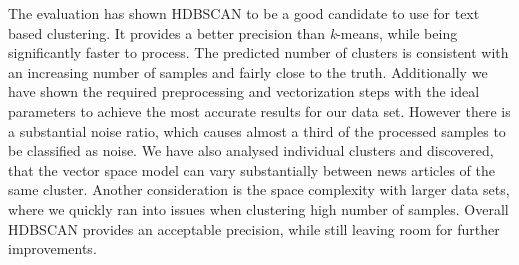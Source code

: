 The evaluation has shown HDBSCAN to be a good candidate to use for text based clustering.
It provides a better precision than \textit{k}-means, while being significantly faster to process.
The predicted number of clusters is consistent with an increasing number of samples and fairly close to the truth.
Additionally we have shown the required preprocessing and vectorization steps with the ideal parameters
to achieve the most accurate results for our data set.
However there is a substantial noise ratio,
which causes almost a third of the processed samples to be classified as noise.
We have also analysed individual clusters and discovered,
that the vector space model can vary substantially between news articles of the same cluster.
Another consideration is the space complexity with larger data sets,
where we quickly ran into issues when clustering high number of samples.
Overall HDBSCAN provides an acceptable precision, while still leaving room for further improvements.
